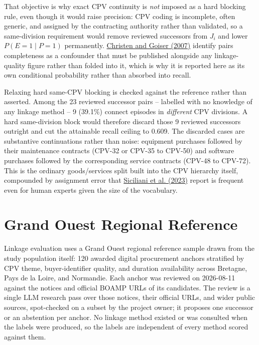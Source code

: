 \documentclass[11pt,a4paper]{article}
\begin{document}
That objective is why exact CPV continuity is \emph{not} imposed as a hard
blocking rule, even though it would raise precision: CPV coding is incomplete,
often generic, and assigned by the contracting authority rather than validated,
so a same-division requirement would remove reviewed successors from \(J_i\) and
lower \(P(E=1\mid P=1)\) permanently.
\href{https://doi.org/10.1007/978-3-540-44918-8_6}{Christen and Goiser (2007)}
identify pairs completeness as a confounder that must be published alongside any
linkage-quality figure rather than folded into it, which is why it is reported
here as its own conditional probability rather than absorbed into recall.

Relaxing hard same-CPV blocking is checked against the reference rather than
asserted. Among the 23 reviewed
successor pairs -- labelled with no knowledge of any linkage method --
9
(39.1\%) connect episodes in
\emph{different} CPV divisions. A hard same-division block would therefore
discard those 9
reviewed successors outright and cut the attainable recall ceiling to
0.609. The
discarded cases are substantive continuations rather than noise: equipment
purchases followed by their maintenance contracts (CPV-32 or CPV-35 to CPV-50)
and software purchases followed by the corresponding service contracts (CPV-48
to CPV-72). This is the ordinary goods/services split built into the CPV
hierarchy itself, compounded by assignment error that
\href{https://aclanthology.org/2023.clicit-1.47}{Siciliani et al. (2023)}
report is frequent even for human experts given the size of the vocabulary.

\section{Grand Ouest Regional Reference}
\label{sec:linkage-caveat}
Linkage evaluation uses a Grand Ouest regional reference sample drawn from the
study population itself: 120 awarded digital procurement anchors
stratified by CPV theme, buyer-identifier quality, and duration availability
across Bretagne, Pays de la Loire, and Normandie. Each anchor was reviewed on
2026-08-11 against the notices and official BOAMP URLs of its candidates. The
review is a single LLM research pass over those notices, their official URLs, and
wider public sources, spot-checked on a subset by the project owner; it proposes
one successor or an abstention per anchor. No linkage method existed or was
consulted when the labels were produced, so the labels are independent of every
method scored against them.
\end{document}
